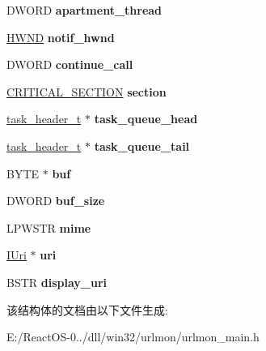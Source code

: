 \begin{DoxyCompactItemize}
D\+W\+O\+RD {\bfseries apartment\+\_\+thread}
\item 
\mbox{\label{struct_bind_protocol_aa22b7f6148e82d0625bcbfcf6f320ac1}} 
\hyperlink{interfacevoid}{H\+W\+ND} {\bfseries notif\+\_\+hwnd}
\item 
\mbox{\label{struct_bind_protocol_ada8bc78c79d8b2bed2cd1006480edad9}} 
D\+W\+O\+RD {\bfseries continue\+\_\+call}
\item 
\mbox{\label{struct_bind_protocol_af1e9890ac79cfc530d22bfa3a5005ac1}} 
\hyperlink{struct___c_r_i_t_i_c_a_l___s_e_c_t_i_o_n}{C\+R\+I\+T\+I\+C\+A\+L\+\_\+\+S\+E\+C\+T\+I\+ON} {\bfseries section}
\item 
\mbox{\label{struct_bind_protocol_afc561eac68f0cf14f7148fde544684e2}} 
\hyperlink{structtask__header__t}{task\+\_\+header\+\_\+t} $\ast$ {\bfseries task\+\_\+queue\+\_\+head}
\item 
\mbox{\label{struct_bind_protocol_a0b9c3cf686f87da0f5357b0d54216bfa}} 
\hyperlink{structtask__header__t}{task\+\_\+header\+\_\+t} $\ast$ {\bfseries task\+\_\+queue\+\_\+tail}
\item 
\mbox{\label{struct_bind_protocol_a058a1525f34319f11ce620531486fe25}} 
B\+Y\+TE $\ast$ {\bfseries buf}
\item 
\mbox{\label{struct_bind_protocol_a2473b7cfa79f3ac4faa0036f7775b040}} 
D\+W\+O\+RD {\bfseries buf\+\_\+size}
\item 
\mbox{\label{struct_bind_protocol_a91a0cf7ed1f63e26576b0dc86ce7e73e}} 
L\+P\+W\+S\+TR {\bfseries mime}
\item 
\mbox{\label{struct_bind_protocol_a422ca0ef1eae71e416a96bd89f695822}} 
\hyperlink{interface_i_uri}{I\+Uri} $\ast$ {\bfseries uri}
\item 
\mbox{\label{struct_bind_protocol_a435fd5f7ae2027757e42b8b260d47ba1}} 
B\+S\+TR {\bfseries display\+\_\+uri}
\end{DoxyCompactItemize}


该结构体的文档由以下文件生成\+:\begin{DoxyCompactItemize}
\item 
E\+:/\+React\+O\+S-\/0../dll/win32/urlmon/urlmon\+\_\+main.\+h\end{DoxyCompactItemize}
